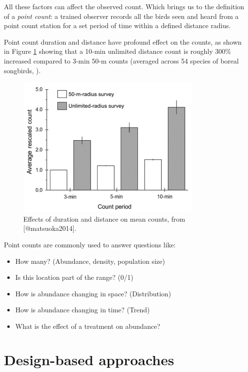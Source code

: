 \documentclass[12pt,]{book}
\providecommand{\tightlist}{%
  \setlength{\itemsep}{0pt}\setlength{\parskip}{0pt}}
\begin{document}
All these factors can affect the observed count.
Which brings us to the definition of a \emph{point count}:
a trained observer
records all the birds
seen and heard
from a point count station
for a set period of time
within a defined distance radius.

Point count duration and distance have profound effect
on the counts, as shown in Figure \ref{fig:intro-1}
showing that a 10-min unlimited distance count
is roughly 300\% increased compared to 3-min 50-m counts
(averaged across 54 species of boreal songbirds, \citep{matsuoka2014}).

\begin{figure}
\includegraphics[width=0.8\linewidth]{images/matsuoka-2014-fig-2} \caption{Effects of duration and distance on mean counts, from [@matsuoka2014].}\label{fig:intro-1}
\end{figure}

Point counts are commonly used to answer questions like:

\begin{itemize}
\tightlist
\item
  How many? (Abundance, density, population size)
\item
  Is this location part of the range? (0/1)
\item
  How is abundance changing in space? (Distribution)
\item
  How is abundance changing in time? (Trend)
\item
  What is the effect of a treatment on abundance?
\end{itemize}

\hypertarget{design-based-approaches}{%
\section{Design-based approaches}\label{design-based-approaches}}
\end{document}
